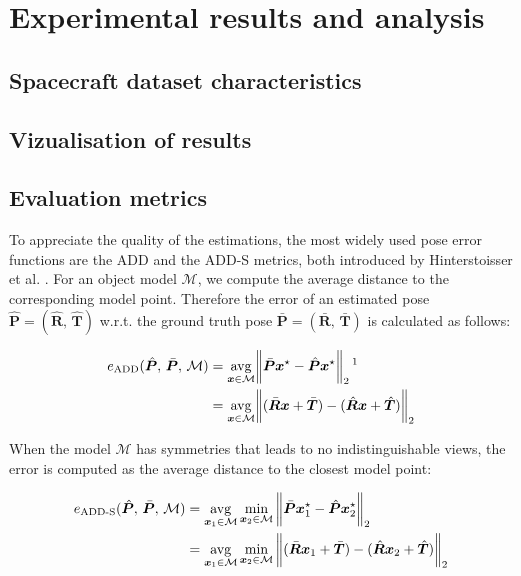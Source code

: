 
\chapter{Experimental results and analysis}\label{chapter:presentation_of_the_results}

\section{Spacecraft dataset characteristics}
\section{Vizualisation of results}
\section{Evaluation metrics}

To appreciate the quality of the estimations, the most widely used pose error functions are the \ac{ADD} and the \ac{ADD-S} metrics, both introduced by Hinterstoisser et al. \cite{10.1007/978-3-642-37331-2_42}. For an object model $\mathcal{M}$, we compute the average distance to the corresponding model point. Therefore the error of an estimated pose $\hat{\bm{P}}=(\hat{\bm{R}},\,\hat{\bm{T}})$ w.r.t. the ground truth pose $\bar{\bm{P}}=(\bar{\bm{R}},\,\bar{\bm{T}})$ is calculated as follows:

\begin{align}
	e_\mathrm{ADD}(\hat{\bm{P}},\,\bar{\bm{P}},\,\mathcal{M})&=\underset{\bm{x}\in\mathcal{M}}{\mathrm{avg}}\norm\bigg{\bar{\bm{P}}\bm{x}^\star-\hat{\bm{P}}\bm{x}^\star}_2 \,\textit{\footnotemark}\\
	&=\underset{\bm{x}\in\mathcal{M}}{\mathrm{avg}}\norm\bigg{(\bar{\bm{R}}\bm{x}+\bar{\bm{T}})-(\hat{\bm{R}}\bm{x}+\hat{\bm{T}})}_2
\end{align}

When the model $\mathcal{M}$ has symmetries that leads to no indistinguishable views, the error is computed as the average distance to the closest model point:
 
\begin{align}
	e_{\mathrm{ADD}\text{-}\mathrm{S}}(\hat{\bm{P}},\,\bar{\bm{P}},\,\mathcal{M})&= \underset{\bm{x}_1\in\mathcal{M}}{\mathrm{avg}}\min\limits_{\bm{x}_2\in\mathcal{M}}\norm\bigg{\bar{\bm{P}}\bm{x}_1^\star-\hat{\bm{P}}\bm{x}_2^\star}_2 \\
	&=\underset{\bm{x}_1\in\mathcal{M}}{\mathrm{avg}}\min\limits_{\bm{x}_2\in\mathcal{M}}\norm\bigg{(\bar{\bm{R}}\bm{x}_1+\bar{\bm{T}})-(\hat{\bm{R}}\bm{x}_2+\hat{\bm{T}})}_2
\end{align}

